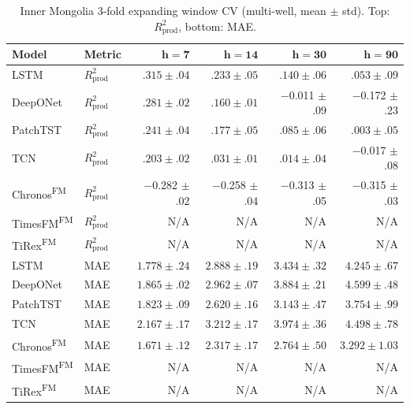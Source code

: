 \documentclass[11pt]{article}
\newcommand{\best}[1]{\textbf{#1}}
\newcommand{\fm}{\textsuperscript{FM}}
\newcommand{\rp}{R^2_\text{prod}}
\begin{document}
\begin{table}[ht]
\centering
\caption{Inner Mongolia 3-fold expanding window CV (multi-well, mean $\pm$ std). Top: $\rp$, bottom: MAE.}
\label{tab:im_cv}
\scriptsize
\setlength{\tabcolsep}{2.5pt}
\begin{tabular}{@{}ll rrrr @{}}
\toprule
\textbf{Model} & \textbf{Metric} & $\boldsymbol{h{=}7}$ & $\boldsymbol{h{=}14}$ & $\boldsymbol{h{=}30}$ & $\boldsymbol{h{=}90}$ \\
\midrule
LSTM          & $\rp$ & \best{$.315 \pm .04$} & \best{$.233 \pm .05$} & \best{$.140 \pm .06$} & \best{$.053 \pm .09$} \\
DeepONet      & $\rp$ & $.281 \pm .02$ & $.160 \pm .01$ & $-$0.011 $\pm$ .09 & $-$0.172 $\pm$ .23 \\
PatchTST      & $\rp$ & $.241 \pm .04$ & $.177 \pm .05$ & $.085 \pm .06$ & $.003 \pm .05$ \\
TCN           & $\rp$ & $.203 \pm .02$ & $.031 \pm .01$ & $.014 \pm .04$ & $-$0.017 $\pm$ .08 \\
Chronos\fm    & $\rp$ & $-$0.282 $\pm$ .02 & $-$0.258 $\pm$ .04 & $-$0.313 $\pm$ .05 & $-$0.315 $\pm$ .03 \\
TimesFM\fm    & $\rp$ & N/A & N/A & N/A & N/A \\
TiRex\fm      & $\rp$ & N/A & N/A & N/A & N/A \\
\midrule
LSTM          & MAE & $1.778 \pm .24$ & $2.888 \pm .19$ & $3.434 \pm .32$ & $4.245 \pm .67$ \\
DeepONet      & MAE & $1.865 \pm .02$ & $2.962 \pm .07$ & $3.884 \pm .21$ & $4.599 \pm .48$ \\
PatchTST      & MAE & $1.823 \pm .09$ & $2.620 \pm .16$ & $3.143 \pm .47$ & $3.754 \pm .99$ \\
TCN           & MAE & $2.167 \pm .17$ & $3.212 \pm .17$ & $3.974 \pm .36$ & $4.498 \pm .78$ \\
Chronos\fm    & MAE & \best{$1.671 \pm .12$} & \best{$2.317 \pm .17$} & \best{$2.764 \pm .50$} & \best{$3.292 \pm 1.03$} \\
TimesFM\fm    & MAE & N/A & N/A & N/A & N/A \\
TiRex\fm      & MAE & N/A & N/A & N/A & N/A \\
\bottomrule
\end{tabular}
\end{table}
\end{document}
